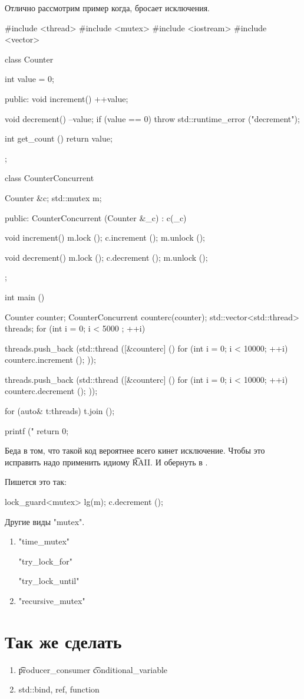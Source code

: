 Отлично рассмотрим пример когда,  бросает исключения.

\begin{cppcode}
#include <thread>
#include <mutex>
#include <iostream>
#include <vector>


class Counter {
  int value = 0;

public:
  void increment() {
    ++value;
  }

  void decrement() {
    --value;
    if (value == 0) {
      throw std::runtime_error ("decrement");
    }
  }

  int get_count () {
    return value;
  }
};

class CounterConcurrent {
  Counter &c;
  std::mutex m;

public:
  CounterConcurrent (Counter &_c) : c(_c){
  }

  void increment() {
    m.lock ();
    c.increment ();
    m.unlock ();
  }

  void decrement() {
    m.lock ();
    c.decrement ();
    m.unlock ();
  }
};


int main () {
  Counter counter;
  CounterConcurrent counterc(counter);
  std::vector<std::thread> threads;
  for (int i = 0; i < 5000 ; ++i) {
    threads.push_back (std::thread ([&counterc] () {
        for (int i = 0; i < 10000; ++i) {
          counterc.increment ();
        }
    }));

    threads.push_back (std::thread ([&counterc] () {
        for (int i = 0; i < 10000; ++i) {
          counterc.decrement ();
        }
    }));
  }

  for (auto& t:threads) {
    t.join ();
  }

  printf ("%
  return 0;
}
\end{cppcode}

Беда в том, что такой код вероятнее всего кинет исключение.
Чтобы это исправить надо применить идиому \t{RAII}.
И обернуть  в .

Пишется это так:
\begin{cppcode}
lock_guard<mutex> lg(m);
c.decrement ();
\end{cppcode}


Другие виды \cpp"mutex".
\begin{enumerate}
\item
\cpp"time_mutex"

\cpp"try_lock_for"

\cpp"try_lock_until"
\item
\cpp"recursive_mutex"

\end{enumerate}


\section{Так же сделать}
\begin{enumerate}
\item
\t{producer\_consumer}
\t{conditional\_variable}
\item
std::bind, ref, function

\end{enumerate}